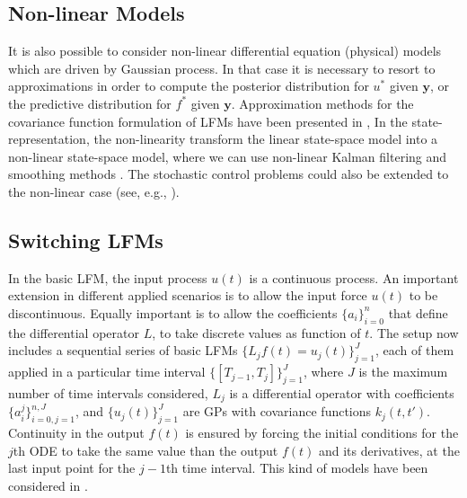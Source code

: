 \documentclass[journal]{IEEEtran}
\newcommand{\simo}[1]{{\color{red}#1}}
\begin{document}
%
%
\subsection{Non-linear Models}


It is also possible to consider non-linear differential equation (physical) models which are driven by Gaussian process. In that case it is 
necessary to resort to approximations in order to compute the posterior distribution for $u^*$ given $\mathbf{y}$, or the predictive distribution for $f^*$ given $\mathbf{y}$. Approximation methods for the covariance function formulation of LFMs have been presented in \cite{Lawrence:gpsim2007a,Gao:latent08,Titsias:BMC:2012}, In the state-representation, the non-linearity transform the linear state-space model into a non-linear state-space model, where we can use non-linear Kalman filtering and smoothing methods \cite{Hartikainen+Seppanen+Sarkka:2012,Sarkka:2013}. The stochastic control problems could also be extended to the non-linear case (see, e.g., \cite{Maybeck:1982b}).

\subsection{Switching LFMs}

In the basic LFM, the input process $u(t)$ is a continuous process. An important extension in different applied scenarios
is to allow the input force $u(t)$ to be discontinuous. Equally important is to allow the coefficients $\{a_i\}_{i=0}^n$ that
define the differential operator $L$, to take discrete values as function of $t$. The setup now includes a sequential
series of basic LFMs $\{L_jf(t) = u_j(t)\}_{j=1}^J$, each of them applied in a particular time interval
$\{[T_{j-1}, T_j]\}_{j=1}^J$, where $J$ is the maximum number of time intervals considered, $L_j$ is a differential operator
with coefficients $\{a_i^j\}_{i=0,j=1}^{n, J}$, and $\{u_j(t)\}_{j=1}^J$ are GPs with covariance functions $k_j(t,t')$.
Continuity in the output $f(t)$ is ensured by forcing the initial conditions for the $j$th ODE to take the same value
than the output $f(t)$ and its derivatives, at the last input point for the $j-1$th time interval. This kind of models have been considered in \cite{Alvarez:switched11,Hartikainen+Sarkka:2011}.
\end{document}
